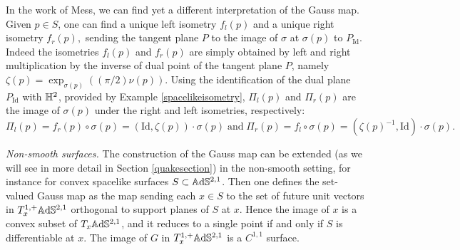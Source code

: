      \begin{observation}\label{DiafGauss}
        In the work of Mess, we can find yet a different interpretation of the Gauss map. Given $p\in S$, one can find a unique left isometry $f_l(p)$ and a unique right isometry $f_r(p),$ sending the tangent plane $P$ to the image of $\sigma$ at $\sigma(p)$ to $P_{\text{Id}}$. Indeed the isometries $f_l(p)$ and $f_r(p)$ are simply obtained by left and right multiplication by the inverse of dual point of the tangent plane $P$, namely $\zeta(p)=\exp_{\sigma(p)}((\pi/2)\nu(p))$. Using the identification of the dual plane $P_{\text{Id}}$ with $\mathbb{H}^2$, provided by Example \ref{spacelikeisometry}, $\Pi_l(p)$ and $\Pi_r(p)$ are the image of $\sigma(p)$ under the right and left isometries, respectively:
        \[
        \Pi_l(p)=f_r(p)\circ\sigma(p)=(\text{Id},\zeta(p))\cdot \sigma(p)\;\text{and}\;\Pi_r(p)=f_l\circ\sigma(p)=(\zeta(p)^{-1},\text{Id})\cdot\sigma(p).
        \]
    \end{observation}





\textit{Non-smooth surfaces.} The construction of the Gauss map can be extended (as we will see in more detail in Section \ref{quakesection}) in the non-smooth setting, for instance for convex spacelike surfaces $S\subset\mathbb{A}\mathrm{d}\mathbb{S}^{2,1}$. Then one defines the set-valued Gauss map as the map sending each $x\in S$ to the set of future unit vectors in $T_x^{1,+}\mathbb{A}\mathrm{d}\mathbb{S}^{2,1}$ orthogonal to support planes of $S$ at $x$. Hence the image of $x$ is a convex subset of $T_x\mathbb{A}\mathrm{d}\mathbb{S}^{2,1}$, and it reduces to a single point if and only if $S$ is differentiable at $x$. The image of $G$ in $T^{1,+}_x\mathbb{A}\mathrm{d}\mathbb{S}^{2,1}$ is a $C^{1,1}$ surface. \\

